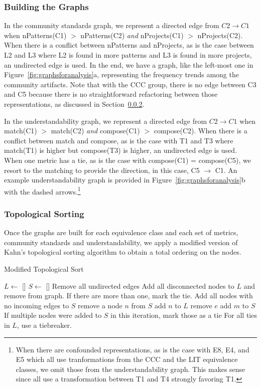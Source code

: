 \subsubsection{Building the Graphs}
In the community standards graph, we represent a directed edge from $C2 \rightarrow C1$ when  nPatterns(C1) $>$ nPatterns(C2) \emph{and}  nProjects(C1) $>$ nProjects(C2). When there is a conflict between nPatterns and nProjects, as is the case between L2 and L3 where L2 is found in more patterns and L3 is found in more projects, an undirected edge is used. In the end, we have a graph, like the left-most one in Figure~\ref{fig:graphsforanalysis}a, representing the frequency trends among the community artifacts. Note that with the CCC group, there is no edge between C3 and C5 because there is no straightforward refactoring between those representations, as discussed in Section~\ref{}. 

In the understandability graph, we represent a directed edge from $C2 \rightarrow C1$ when match(C1) $>$ match(C2) \emph{and} compose(C1) $>$ compose(C2). When there is a conflict between match and compose, as is the case with T1 and T3 where match(T1) is higher but compose(T3) is higher, an undirected edge is used. When one metric has a tie, as is the case with compose(C1) = compose(C5), we resort to the matching to provide the direction, in this case, C5 $\rightarrow$ C1. An example understandability graph is provided in Figure~\ref{fig:graphsforanalysis}b with the dashed arrows.\footnote{When there are confounded representations, as is the case with E8, E4, and E5 which all use tranformations from the CCC and the LIT equivalence classes, we omit those from the understandability graph. This makes sense since all use a transformation between T1 and T4 strongly favoring T1. }

\subsubsection{Topological Sorting}
Once the graphs are built for each equivalence class and each set of metrics, community standards and understandability, we apply a modified version of Kahn's topological sorting algorithm to obtain a total ordering on the nodes. 

\begin{algorithm}
  \caption{Modified Topological Sort}\label{topological}
  \begin{algorithmic}[1]
\State  $L \gets$ []
\State $S \gets$ []
\State Remove all undirected edges
\State Add all disconnected nodes to $L$ and remove from graph. If there are more than one, mark the tie. \label{markTie1}
\State Add all nodes with no incoming edges to $S$
	\State remove a node $n$ from $S$ \label{setn}
	\State add $n$ to $L$ 
		\State remove $e$
			\State add $m$ to $S$ \label{addToS}
		\EndIf
	\EndFor
	\State If multiple nodes were added to $S$ in this iteration, mark those as a tie \label{markTie2}
\EndWhile
\State For all ties in $L$, use a tiebreaker. 
  \end{algorithmic}
\end{algorithm}

